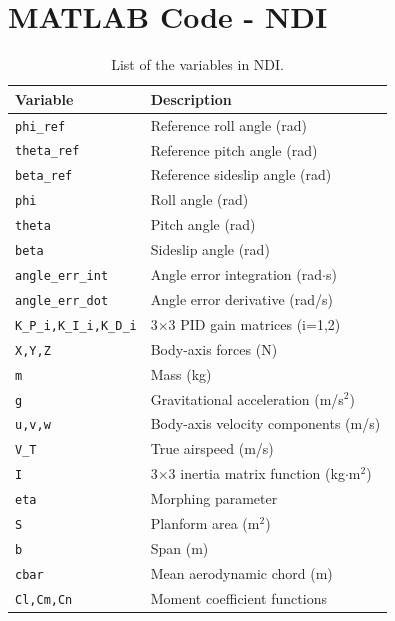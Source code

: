 \documentclass[a4paper, 12pt]{report}
\begin{document}
	\chapter{MATLAB Code - NDI}
	
	\begin{table}[h]
		\centering
		\begin{tabular}{ll}
			\toprule
			\textbf{Variable} & \textbf{Description} \\
			\midrule
			\verb+phi_ref+ & Reference roll angle (rad) \\
			\verb+theta_ref+ & Reference pitch angle (rad) \\
			\verb+beta_ref+ & Reference sideslip angle (rad) \\
			\verb+phi+ & Roll angle (rad) \\
			\verb+theta+ & Pitch angle (rad) \\
			\verb+beta+ & Sideslip angle (rad) \\
			\verb+angle_err_int+ & Angle error integration (rad$\cdot$s) \\
			\verb+angle_err_dot+ & Angle error derivative (rad/s) \\
			\verb+K_P_i,K_I_i,K_D_i+ & 3$\times$3 PID gain matrices (i=1,2) \\
			\verb+X,Y,Z+ & Body-axis forces (N) \\
			\verb+m+ & Mass (kg) \\
			\verb+g+ & Gravitational acceleration (m/s$^2$) \\
			\verb+u,v,w+ & Body-axis velocity components (m/s) \\
			\verb+V_T+ & True airspeed (m/s) \\
			\verb+I+ & 3$\times$3 inertia matrix function (kg$\cdot$m$^2$) \\
			\verb+eta+ & Morphing parameter \\
			\verb+S+ & Planform area (m$^2$) \\
			\verb+b+ & Span (m) \\
			\verb+cbar+ & Mean aerodynamic chord (m) \\
			\verb+Cl,Cm,Cn+ & Moment coefficient functions \\
			\bottomrule
		\end{tabular}
		\caption{List of the variables in NDI.}
		\label{tab:ndi_variables}
	\end{table}
	
	\pagebreak
	
\end{document}
